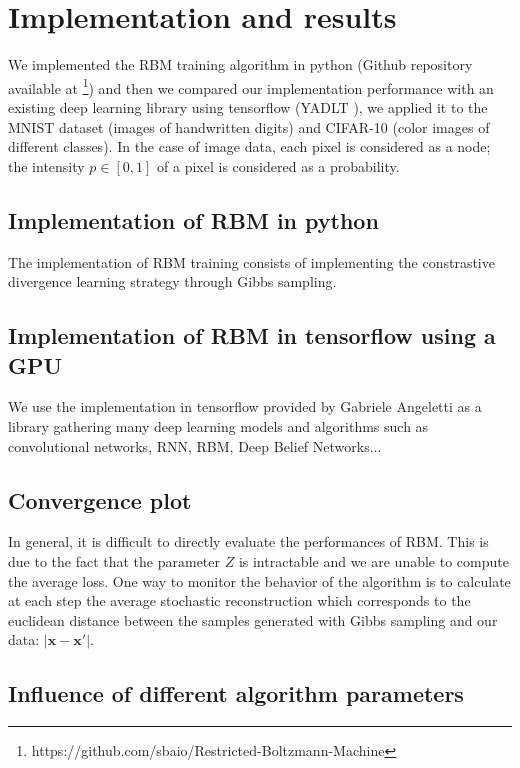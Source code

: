 \documentclass{article}
\begin{document}
\clearpage
\section{Implementation and results}

We implemented the RBM training algorithm in python (Github repository available at \footnote{https://github.com/sbaio/Restricted-Boltzmann-Machine}) and then we compared our implementation performance with an existing deep learning library using tensorflow (YADLT \cite{yadltGithub}), we applied it to the MNIST dataset (images of handwritten digits) and CIFAR-10 (color images of different classes). In the case of image data, each pixel is considered as a node; the intensity $p \in [0,1]$ of a pixel is considered as a probability. \\

\subsection{Implementation of RBM in python}

The implementation of RBM training consists of implementing the constrastive divergence learning strategy through Gibbs sampling.


\subsection{Implementation of RBM in tensorflow using a GPU}

We use the implementation in tensorflow provided by Gabriele Angeletti as a library gathering many deep learning models and algorithms such as convolutional networks, RNN, RBM, Deep Belief Networks...

\subsection{Convergence plot}

In general, it is difficult to directly evaluate the performances of RBM. This is due to the fact that the parameter $Z$ is intractable and we are unable to compute the average loss. One way to monitor the behavior of the algorithm is to calculate at each step the average stochastic reconstruction which corresponds to the euclidean distance between the samples generated with Gibbs sampling and our data: $\lvert \mathbf{x} - \mathbf{x'} \rvert$.

\subsection{Influence of different algorithm parameters}
\end{document}
